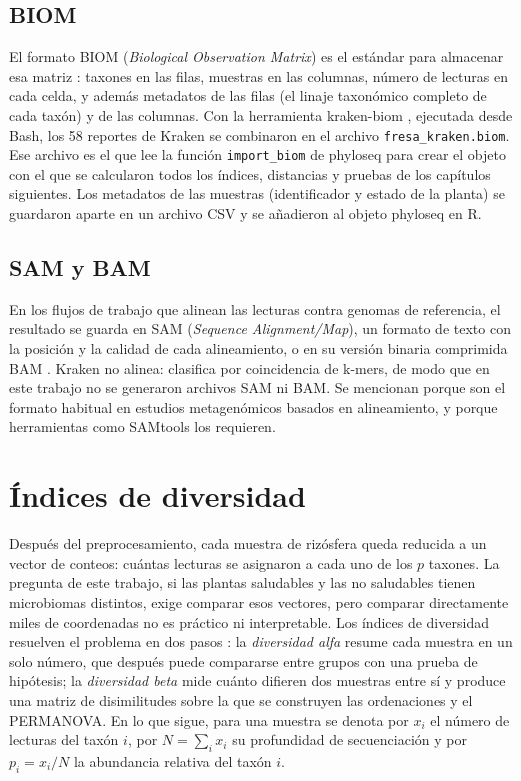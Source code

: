 \subsection{BIOM}
El formato BIOM (\emph{Biological Observation Matrix}) es el estándar para almacenar esa matriz
\citep{mcdonald2012biom}: taxones en las filas, muestras en las columnas, número de lecturas en cada
celda, y además metadatos de las filas (el linaje taxonómico completo de cada taxón) y de las
columnas. Con la herramienta kraken-biom \citep{dabdoub2016krakenbiom}, ejecutada desde Bash, los 58
reportes de Kraken se combinaron en el archivo \texttt{fresa\_kraken.biom}. Ese archivo es el que
lee la función \texttt{import\_biom} de phyloseq para crear el objeto con el que se calcularon
todos los índices, distancias y pruebas de los capítulos siguientes. Los metadatos de las muestras
(identificador y estado de la planta) se guardaron aparte en un archivo CSV y se añadieron al objeto
phyloseq en R.

\subsection{SAM y BAM}
En los flujos de trabajo que alinean las lecturas contra genomas de referencia, el resultado se
guarda en SAM (\emph{Sequence Alignment/Map}), un formato de texto con la posición y la calidad de
cada alineamiento, o en su versión binaria comprimida BAM \citep{li2009sequence}. Kraken no alinea:
clasifica por coincidencia de k-mers, de modo que en este trabajo no se generaron archivos SAM ni
BAM. Se mencionan porque son el formato habitual en estudios metagenómicos basados en alineamiento,
y porque herramientas como SAMtools los requieren.

\section{Índices de diversidad}
\label{sec:indices}

Después del preprocesamiento, cada muestra de rizósfera queda reducida a un vector de conteos: cuántas
lecturas se asignaron a cada uno de los $p$ taxones. La pregunta de este trabajo, si las plantas
saludables y las no saludables tienen microbiomas distintos, exige comparar esos vectores, pero
comparar directamente miles de coordenadas no es práctico ni interpretable. Los índices de diversidad
resuelven el problema en dos pasos \citep{magurran2021measuring, tuomisto2010consistent}: la
\emph{diversidad alfa} resume cada muestra en un solo número, que después puede compararse entre
grupos con una prueba de hipótesis; la \emph{diversidad beta} mide cuánto difieren dos muestras entre
sí y produce una matriz de disimilitudes sobre la que se construyen las ordenaciones y el PERMANOVA.
En lo que sigue, para una muestra se denota por $x_i$ el número de lecturas del taxón $i$, por
$N = \sum_i x_i$ su profundidad de secuenciación y por $p_i = x_i / N$ la abundancia relativa del
taxón $i$.

